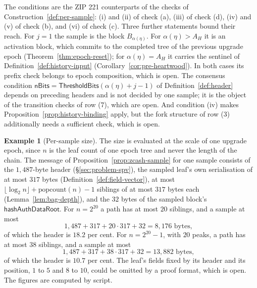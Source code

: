 \documentclass[11pt,a4paper]{article}
\theoremstyle{definition}
\newtheorem{example}[theorem]{Example}
\begin{document}
The conditions are the ZIP 221 counterparts of the checks of
Construction~\ref{def:per-sample}: (i) and (ii) of check (a), (iii) of check
(d), (iv) and (v) of check (b), and (vi) of check (c). Three further
statements bound their reach. For $j = 1$ the sample is the block
$B_{\alpha(\eta)}$. For $\alpha(\eta) > A_H$ it is an activation block, which
commits to the completed tree of the previous upgrade epoch
(Theorem~\ref{thm:epoch-reset}); for $\alpha(\eta) = A_H$ it carries the
sentinel of Definition~\ref{def:history-input}
(Corollary~\ref{cor:pre-heartwood}). In both cases its prefix check belongs
to epoch composition, which is open. The consensus condition
$\mathsf{nBits} = \mathsf{ThresholdBits}(\alpha(\eta) + j - 1)$ of
Definition~\ref{def:header} depends on preceding headers and is not decided
by one sample; it is the object of the transition checks of row (7), which
are open. And condition (iv) makes Proposition~\ref{prop:history-binding}
apply, but the fork structure of row (3) additionally needs a sufficient
check, which is open.

\begin{example}[Per-sample size]\label{ex:sample-size}
The size is evaluated at the scale of one upgrade epoch, since $n$ is the
leaf count of one epoch tree and never the length of the chain. The message
of Proposition~\ref{prop:zcash-sample} for one sample consists of the
$1{,}487$-byte header (\S\ref{sec:problem-spv}), the sampled leaf's own
serialisation of at most $317$ bytes (Definition~\ref{def:field-vector}), at
most $\lfloor \log_2 n \rfloor + \mathrm{popcount}(n) - 1$ siblings of at
most $317$ bytes each (Lemma~\ref{lem:bag-depth}), and the $32$ bytes of the
sampled block's $\mathsf{hashAuthDataRoot}$. For $n = 2^{20}$ a path has at
most $20$ siblings, and a sample at most
\[
  1{,}487 + 317 + 20 \cdot 317 + 32 = 8{,}176 \text{ bytes},
\]
of which the header is $18.2$ per cent. For $n = 2^{20} - 1$, with $20$
peaks, a path has at most $38$ siblings, and a sample at most
\[
  1{,}487 + 317 + 38 \cdot 317 + 32 = 13{,}882 \text{ bytes},
\]
of which the header is $10.7$ per cent. The leaf's fields fixed by its
header and its position, $1$ to $5$ and $8$ to $10$, could be omitted by a
proof format, which is open. The figures are computed by script.
\end{example}
\end{document}
